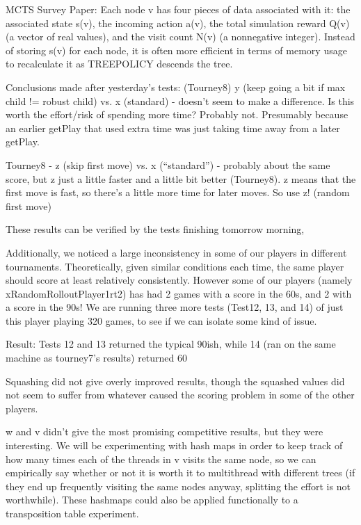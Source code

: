 \documentclass[letterpaper]{article}
\begin{document}
MCTS Survey Paper:
Each node v has four pieces of data associated with it: the associated state s(v), the incoming action a(v), the total simulation reward Q(v) (a vector of real values), and the visit count N(v) (a nonnegative integer). Instead of storing s(v) for each node, it is often more efficient in terms of memory usage to recalculate it as TREEPOLICY descends the tree.

Conclusions made after yesterday’s tests:
(Tourney8) y (keep going a bit if max child != robust child) vs. x (standard) - doesn’t seem to make a difference. Is this worth the effort/risk of spending more time? Probably not. Presumably because an earlier getPlay that used extra time was just taking time away from a later getPlay.


Tourney8 - z (skip first move) vs. x (“standard”) - probably about the same score, but z just a little faster and a little bit better (Tourney8). z means that the first move is fast, so there’s a little more time for later moves. So use z! (random first move)

These results can be verified by the tests finishing tomorrow morning, 

Additionally, we noticed a large inconsistency in some of our players in different tournaments. Theoretically, given similar conditions each time, the same player should score at least relatively consistently. However some of our players (namely xRandomRolloutPlayer1rt2) has had 2 games with a score in the 60s, and 2 with a score in the 90s!
	We are running three more tests (Test12, 13, and 14) of just this player playing 320 games, to see if we can isolate some kind of issue. 

	Result: Tests 12 and 13 returned the typical 90ish, while 14 (ran on the same machine as tourney7’s results) returned 60

Squashing did not give overly improved results, though the squashed values did not seem to suffer from whatever caused the scoring problem in some of the other players.

w and v didn’t give the most promising competitive results, but they were interesting. We will be experimenting with hash maps in order to keep track of how many times each of the threads in v visits the same node, so we can empirically say whether or not it is worth it to multithread with different trees (if they end up frequently visiting the same nodes anyway, splitting the effort is not worthwhile). These hashmaps could also be applied functionally to a transposition table experiment.
\end{document}
